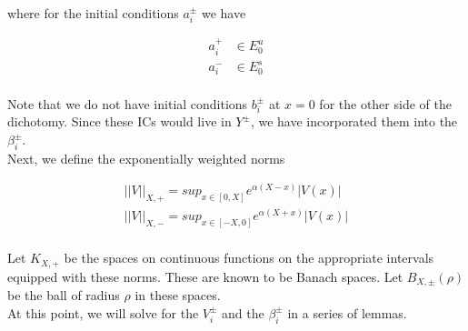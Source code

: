 \documentclass[12pt]{article}
\begin{document}
where for the initial conditions $a_i^\pm$ we have

\begin{align*}
a_i^+ &\in E_0^u \\
a_i^- &\in E_0^s \\
\end{align*}

Note that we do not have initial conditions $b_i^\pm$ at $x = 0$ for the other side of the dichotomy. Since these ICs would live in $Y^\pm$, we have incorporated them into the $\beta_i^\pm$.\\

Next, we define the exponentially weighted norms

\begin{align*}
||V||_{X, +} = sup_{x \in [0, X]} e^{\alpha(X - x)}|V(x)| \\
||V||_{X, -} = sup_{x \in [-X, 0]} e^{\alpha(X + x)}|V(x)| \\
\end{align*}

Let $K_{X, +}$ be the spaces on continuous functions on the appropriate intervals equipped with these norms. These are known to be Banach spaces. Let $B_{X, \pm}(\rho)$ be the ball of radius $\rho$ in these spaces.\\

At this point, we will solve for the $V_i^\pm$ and the $\beta_i^\pm$ in a series of lemmas.\\
\end{document}

